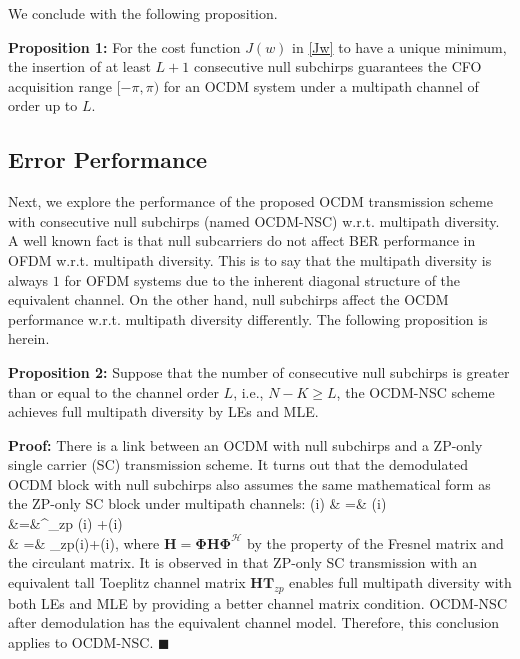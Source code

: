 \documentclass[journal]{IEEEtran}
\begin{document}
We conclude with the following proposition. 

\noindent \textbf{Proposition 1:} For the cost function \(J(w)\) in \eqref{Jw} to have a unique minimum, the insertion of at least \(L+1\) consecutive null subchirps guarantees the CFO acquisition range $[-\pi, \pi)$ for an OCDM system under a multipath channel of order up to \(L\).  %

\subsection{Error Performance}

Next, we explore the performance of the proposed OCDM transmission scheme with consecutive null subchirps (named OCDM-NSC) w.r.t. multipath diversity. A well known fact is that null subcarriers do not affect BER performance in OFDM w.r.t. multipath diversity. This is to say that the multipath diversity is always $1$ for OFDM systems due to the inherent diagonal structure of the equivalent channel. On the other hand, null subchirps affect the OCDM performance w.r.t. multipath diversity differently. The following proposition is herein. 

\noindent \textbf{Proposition 2:}
Suppose that the number of consecutive null subchirps is greater than or equal to the channel order $L$, i.e., $N-K \ge L$, the OCDM-NSC scheme achieves full multipath diversity by LEs and MLE.

\noindent \textbf{Proof:} 
There is a link between an OCDM with null subchirps and a ZP-only single carrier (SC) transmission scheme. It turns out that the demodulated OCDM block with null subchirps also assumes the same mathematical form as the ZP-only SC block under multipath channels:
\beqa
    (i) & =&  \mathbf{\Phi}(i) \\
&=&\mathbf{\Phi}\mathbf{\Phi}^_{\rm zp} (i)  +(i) \nonumber\\
    & =& _{\rm zp}(i)+(i), \nonumber
\enqa
where \(\mathbf{H} = \mathbf{\Phi}\mathbf{H}\mathbf{\Phi}^\mathcal{H}\) by the property of the Fresnel matrix and the circulant matrix. It is observed in \cite{Wang_Optimality_2002} that ZP-only SC transmission with an equivalent tall Toeplitz channel matrix \(\mathbf{H}\mathbf{T}_{zp}\) enables full multipath diversity with both LEs and MLE by providing a better channel matrix condition. OCDM-NSC after demodulation has the equivalent channel model. Therefore, this conclusion applies to OCDM-NSC.  \hfill $\blacksquare$
\end{document}
